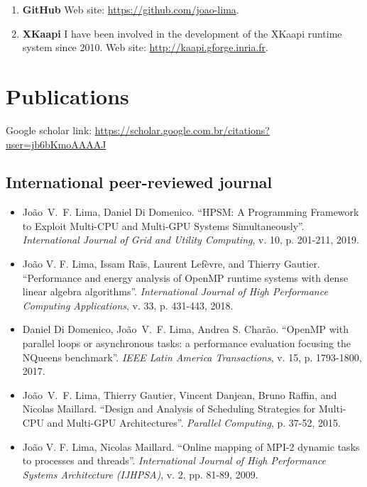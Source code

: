 \documentclass[11pt,a4paper]{article}
\begin{document}
\begin{enumerate}
\item {\bf GitHub} Web site: \url{https://github.com/joao-lima}.
\item {\bf XKaapi} I have been involved in the development of 
the XKaapi runtime system since 2010. Web site: \url{http://kaapi.gforge.inria.fr}.
\end{enumerate}

\section{Publications}

Google scholar link: {\small \url{https://scholar.google.com.br/citations?user=jb6bKmoAAAAJ}}

\subsection{International peer-reviewed journal}

\begin{itemize} \itemsep -2pt

\item
João~V.~F. Lima, Daniel Di Domenico.
``HPSM: A Programming Framework to Exploit Multi-CPU and Multi-GPU Systems Simultaneously''.
\emph{International Journal of Grid and Utility Computing}, v. 10, p. 201-211, 2019. 

\item
João V. F. Lima, Issam Ra\"{i}s, Laurent Lefèvre, and Thierry Gautier.
``Performance and energy analysis of OpenMP runtime systems with dense linear algebra algorithms''.
\emph{International Journal of High Performance Computing Applications}, v. 33, p. 431-443, 2018.

\item
Daniel Di Domenico, João~V.~F. Lima, Andrea S. Charão. 
``OpenMP with parallel loops or asynchronous tasks: a performance evaluation focusing the NQueens benchmark''.
\emph{IEEE Latin America Transactions}, v. 15, p. 1793-1800, 2017.

\item 
João~V.~F. Lima, Thierry Gautier, Vincent Danjean, Bruno Raffin, and Nicolas Maillard.
``Design and Analysis of Scheduling Strategies for Multi-CPU and Multi-GPU Architectures''.
\emph{Parallel Computing}, p. 37-52, 2015.


\item João V. F. Lima, Nicolas Maillard.
``Online mapping of MPI-2 dynamic tasks to processes and threads''.
\emph{International Journal of High Performance Systems Architecture (IJHPSA)}, v. 2, pp. 81-89, 2009.
\end{itemize}
\end{document}

